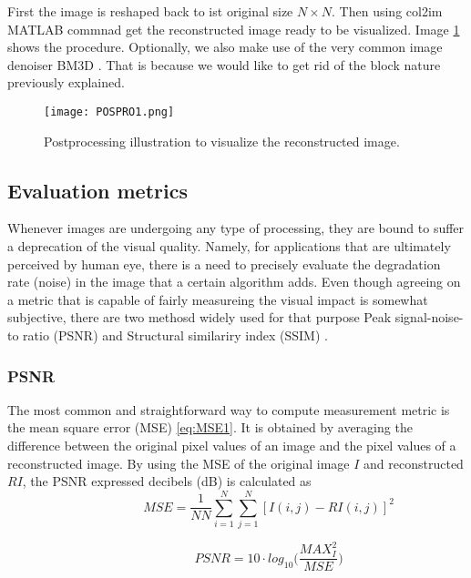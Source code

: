 First the image is reshaped back to ist original size $N \times N$. Then using col2im MATLAB commnad get the reconstructed image ready to be visualized. Image \ref{fig:Posproim1} shows the procedure. Optionally, we also make use of the very common image denoiser BM3D \cite{dabov2007image}. That is because we would like to get rid of the block nature previously explained. 

\begin{figure}[tb] 
\centering 
\texttt{[image: POSPRO1.png]} 
\caption[Postprocessing of recovered images ]{Postprocessing illustration to visualize the reconstructed image.}
\label{fig:Posproim1} 
\end{figure}

\subsection{Evaluation metrics}
Whenever images are undergoing any type of processing, they are bound to suffer a deprecation of the visual quality. Namely, for applications that are ultimately perceived by human eye, there is a need to precisely evaluate the degradation rate (noise) in the image that a certain algorithm adds. Even though agreeing on a metric that is capable of fairly measureing the visual impact is somewhat subjective, there are two methosd widely used for that purpose Peak signal-noise-to ratio (PSNR) and Structural similariry index (SSIM) \cite{wang2004image}.     

\subsubsection{PSNR} 
The most common and straightforward way to compute measurement metric is the mean square error (MSE) \ref{eq:MSE1}. It is obtained by averaging the difference between the original pixel values of an image and the pixel values of a reconstructed image. By using the MSE of the original image $I$ and reconstructed $RI$, the PSNR expressed decibels (dB) is calculated as
\begin{equation} \label{eq:mse1}
\hspace{3em} \hspace{3em} \hspace{3em} MSE = \frac{1}{NN} \sum\limits_{i=1}^N \sum\limits_{j=1}^N [ I( i , j) - RI ( i , j ) ]^2    \enspace \enspace \hspace{3em}
\end{equation} 

\begin{equation} \label{eq:LS1}
\hspace{3em} \hspace{3em} \hspace{3em} PSNR = 10 \cdot log_{10} \bigg( \frac{ MAX_{I}^{2} }{MSE} \bigg) \enspace \enspace \hspace{3em}
\end{equation} 

